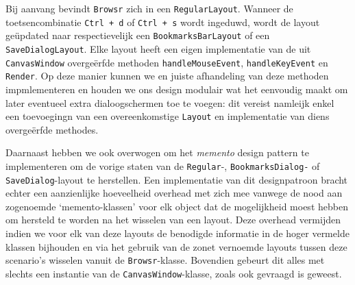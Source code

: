 \documentclass[12pt]{article}
\begin{document}
Bij aanvang bevindt \texttt{Browsr} zich in een \texttt{RegularLayout}. Wanneer de toetsencombinatie \texttt{Ctrl + d} of \texttt{Ctrl + s} wordt ingeduwd, wordt de layout geüpdated naar respectievelijk een \texttt{BookmarksBarLayout} of een \texttt{SaveDialogLayout}. Elke layout heeft een eigen implementatie van de uit \texttt{CanvasWindow} overgeërfde methoden \texttt{handleMouseEvent}, \texttt{handleKeyEvent} en \texttt{Render}. Op deze manier kunnen we en juiste afhandeling van deze methoden impmlementeren en houden we ons design modulair wat het eenvoudig maakt om later eventueel extra dialoogschermen toe te voegen: dit vereist namleijk enkel een toevoegingn van een overeenkomstige \texttt{Layout} en implementatie van diens overgeërfde methodes.

Daarnaast hebben we ook overwogen om het \textit{memento} design pattern te implementeren om de vorige staten van de \texttt{Regular}-, \texttt{BookmarksDialog-} of \texttt{SaveDialog}-layout te herstellen. Een implementatie van dit designpatroon bracht echter een aanzienlijke hoeveelheid overhead met zich mee vanwege de nood aan zogenoemde `memento-klassen' voor elk object dat de mogelijkheid moest hebben om hersteld te worden na het wisselen van een layout. Deze overhead vermijden indien we voor elk van deze layouts de benodigde informatie in de hoger vermelde klassen bijhouden en via het gebruik van de zonet vernoemde layouts tussen deze scenario's wisselen vanuit de \texttt{Browsr}-klasse. Bovendien gebeurt dit alles met slechts een instantie van de \texttt{CanvasWindow}-klasse, zoals ook gevraagd is geweest.
\end{document}
